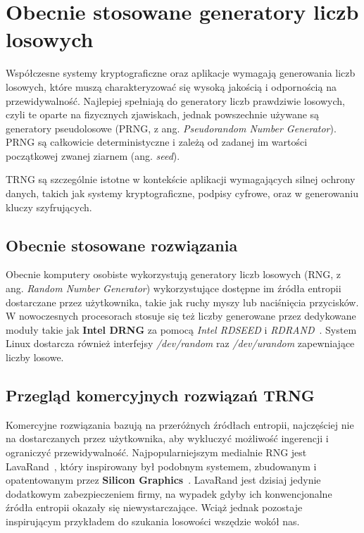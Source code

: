\chapter{Obecnie stosowane generatory liczb losowych}\label{ch:przeglad-rynku}

Współczesne systemy kryptograficzne oraz aplikacje wymagają generowania liczb losowych,
które muszą charakteryzować się wysoką jakością i odpornością na przewidywalność.
Najlepiej spełniają do generatory liczb prawdziwie losowych, czyli te oparte na fizycznych zjawiskach,
jednak powszechnie używane są generatory pseudolosowe (PRNG, z ang. \textit{Pseudorandom Number Generator}).
PRNG są całkowicie deterministyczne i zależą od zadanej im wartości początkowej zwanej ziarnem (ang. \textit{seed}).

TRNG są szczególnie istotne w kontekście aplikacji wymagających silnej ochrony danych,
takich jak systemy kryptograficzne, podpisy cyfrowe, oraz w generowaniu kluczy szyfrujących.

\section{Obecnie stosowane rozwiązania}\label{sec:obecnie-stosowane-rozwiazania}

Obecnie komputery osobiste wykorzystują generatory liczb losowych (RNG, z ang. \textit{Random Number Generator})
wykorzystujące dostępne im źródła entropii dostarczane przez użytkownika, takie jak ruchy myszy lub naciśnięcia przycisków.
W nowoczesnych procesorach stosuje się też liczby generowane przez dedykowane moduły takie jak \textbf{Intel DRNG} za pomocą \textit{Intel RDSEED} i \textit{RDRAND}~\cite{IntelRD}.
System Linux dostarcza również interfejsy \textit{/dev/random} raz \textit{/dev/urandom} zapewniające liczby losowe.

\section{Przegląd komercyjnych rozwiązań TRNG}\label{sec:przeglad-komercyjnych-rozwiazan-trng}

Komercyjne rozwiązania bazują na przeróżnych źródłach entropii,
najczęściej nie na dostarczanych przez użytkownika, aby wykluczyć możliwość ingerencji i ograniczyć przewidywalność.
Najpopularniejszym medialnie RNG jest LavaRand~\cite{cloudflare_lavarand}, który inspirowany był podobnym systemem,
zbudowanym i opatentowanym przez \textbf{Silicon Graphics}~\cite{SiliconGraphics}.
LavaRand jest dzisiaj jedynie dodatkowym zabezpieczeniem firmy,
na wypadek gdyby ich konwencjonalne źródła entropii okazały się niewystarczające.
Wciąż jednak pozostaje inspirującym przykładem do szukania losowości wszędzie wokół nas.

